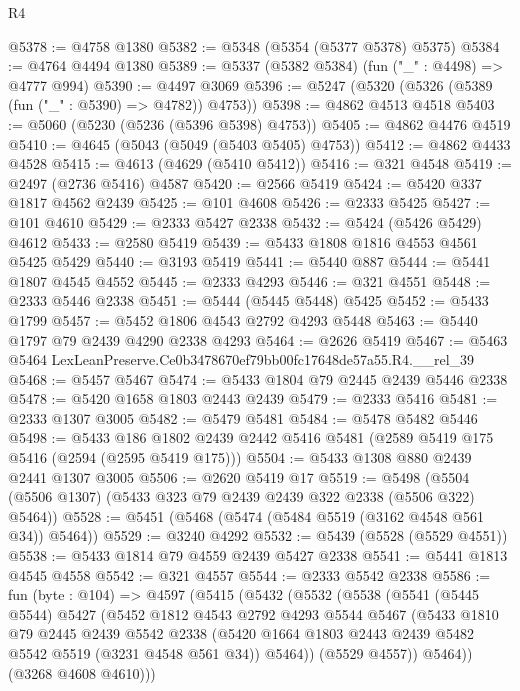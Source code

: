 \begin{lexlean}{R4}
\begin{coremodule}
@5378 := @4758 @1380
@5382 := @5348 (@5354 (@5377 @5378) @5375)
@5384 := @4764 @4494 @1380
@5389 := @5337 (@5382 @5384) (fun ("_" : @4498) => @4777 @994)
@5390 := @4497 @3069
@5396 := @5247 (@5320 (@5326 (@5389 (fun ("_" : @5390) => @4782)) @4753))
@5398 := @4862 @4513 @4518
@5403 := @5060 (@5230 (@5236 (@5396 @5398) @4753))
@5405 := @4862 @4476 @4519
@5410 := @4645 (@5043 (@5049 (@5403 @5405) @4753))
@5412 := @4862 @4433 @4528
@5415 := @4613 (@4629 (@5410 @5412))
@5416 := @321 @4548
@5419 := @2497 (@2736 @5416) @4587
@5420 := @2566 @5419
@5424 := @5420 @337 @1817 @4562 @2439
@5425 := @101 @4608
@5426 := @2333 @5425
@5427 := @101 @4610
@5429 := @2333 @5427 @2338
@5432 := @5424 (@5426 @5429) @4612
@5433 := @2580 @5419
@5439 := @5433 @1808 @1816 @4553 @4561 @5425 @5429
@5440 := @3193 @5419
@5441 := @5440 @887
@5444 := @5441 @1807 @4545 @4552
@5445 := @2333 @4293
@5446 := @321 @4551
@5448 := @2333 @5446 @2338
@5451 := @5444 (@5445 @5448) @5425
@5452 := @5433 @1799
@5457 := @5452 @1806 @4543 @2792 @4293 @5448
@5463 := @5440 @1797 @79 @2439 @4290 @2338 @4293
@5464 := @2626 @5419
@5467 := @5463 @5464 LexLeanPreserve.Ce0b3478670ef79bb00fc17648de57a55.R4.__rel_39
@5468 := @5457 @5467
@5474 := @5433 @1804 @79 @2445 @2439 @5446 @2338
@5478 := @5420 @1658 @1803 @2443 @2439
@5479 := @2333 @5416
@5481 := @2333 @1307 @3005
@5482 := @5479 @5481
@5484 := @5478 @5482 @5446
@5498 := @5433
    @186
    @1802
    @2439
    @2442
    @5416
    @5481
    (@2589 @5419 @175 @5416 (@2594 (@2595 @5419 @175)))
@5504 := @5433 @1308 @880 @2439 @2441 @1307 @3005
@5506 := @2620 @5419 @17
@5519 := @5498 (@5504 (@5506 @1307) (@5433 @323 @79 @2439 @2439 @322 @2338 (@5506 @322) @5464))
@5528 := @5451 (@5468 (@5474 (@5484 @5519 (@3162 @4548 @561 @34)) @5464))
@5529 := @3240 @4292
@5532 := @5439 (@5528 (@5529 @4551))
@5538 := @5433 @1814 @79 @4559 @2439 @5427 @2338
@5541 := @5441 @1813 @4545 @4558
@5542 := @321 @4557
@5544 := @2333 @5542 @2338
@5586 := fun (byte : @104) =>
  @4597
    (@5415
      (@5432
        (@5532
          (@5538
            (@5541
              (@5445 @5544)
              @5427
              (@5452
                @1812
                @4543
                @2792
                @4293
                @5544
                @5467
                (@5433
                  @1810
                  @79
                  @2445
                  @2439
                  @5542
                  @2338
                  (@5420 @1664 @1803 @2443 @2439 @5482 @5542 @5519 (@3231 @4548 @561 @34))
                  @5464))
              (@5529 @4557))
            @5464))
        (@3268 @4608 @4610)))

\end{coremodule}
\end{lexlean}
